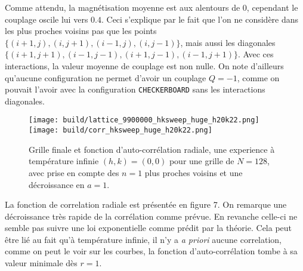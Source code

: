 \documentclass[a4paper, 11pt]{article}
\begin{document}
Comme attendu, la magnétisation moyenne est aux alentours de $0$, cependant le couplage oscile lui
vers $0.4$. Ceci s'explique par le fait que l'on ne considère dans les plus proches voisins pas que
les points $\{(i+1, j), (i, j+1), (i-1, j), (i, j-1)\}$, mais aussi les diagonales $\{(i+1, j+1),
(i-1, j-1), (i+1, j-1), (i-1, j+1)\}$. Avec ces interactions, la valeur moyenne de couplage est non
nulle. On note d'ailleurs qu'aucune configuration ne permet d'avoir un couplage $Q=-1$, comme on
pouvait l'avoir avec la configuration \texttt{CHECKERBOARD} sans les interactions diagonales. 

\begin{figure}
    \centering
    \texttt{[image: build/lattice\_9900000\_hksweep\_huge\_h20k22.png]}
    \texttt{[image: build/corr\_hksweep\_huge\_h20k22.png]}
    \caption{Grille finale et fonction d'auto-corrélation radiale, une experience à température
    infinie $(h, k) = (0, 0)$ pour une grille de $N=128$, avec prise en compte des $n=1$ plus
    proches voisins et une décroissance en $a=1$.} 
    \label{fig:high_en_sca}
\end{figure}

La fonction de correlation radiale est présentée en figure 7. On remarque une décroissance très
rapide de la corrélation comme prévue. En revanche celle-ci ne semble pas suivre une loi exponentielle
comme prédit par la théorie. Cela peut être lié au fait qu'à température infinie, il n'y a \emph{a
priori} aucune correlation, comme on peut le voir sur les courbes, la fonction d'auto-corrélation
tombe à sa valeur minimale dès $r=1$.




\end{document}
